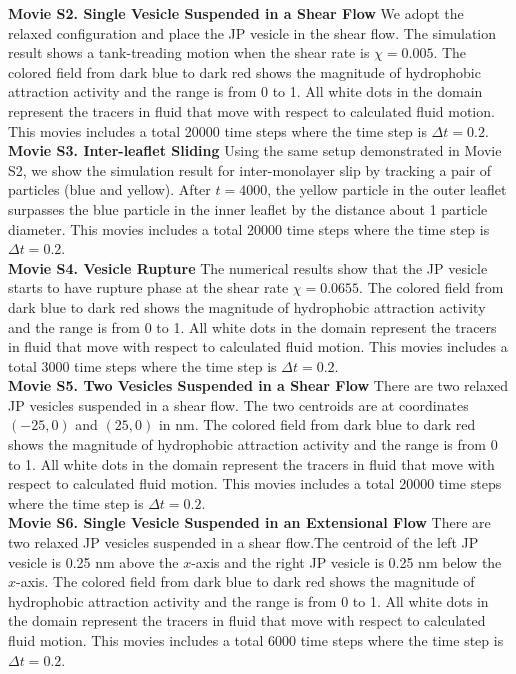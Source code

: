 \noindent
{\bf Movie S2. Single Vesicle Suspended in a Shear Flow} 
We adopt the relaxed configuration and place the JP vesicle in the shear flow. The simulation result shows a tank-treading motion when the shear rate is $\chi=0.005$.
The colored field from dark blue to dark red shows the magnitude of hydrophobic attraction activity and the range is from 0 to 1. All white dots in the domain represent the tracers in fluid that move with respect to calculated fluid motion.
This movies includes a total 20000 time steps where the time step is $\Delta t=0.2$.\\

\noindent
{\bf Movie S3. Inter-leaflet Sliding} 
Using the same setup demonstrated in Movie S2, we show the simulation result for 
inter-monolayer slip by tracking a pair of particles (blue and yellow). After $t=4000$, 
the yellow particle in the outer leaflet surpasses the blue particle in the inner leaflet by the distance about 1 particle diameter.
This movies includes a total 20000 time steps where the time step is $\Delta t=0.2$.\\


\noindent
{\bf Movie S4. Vesicle Rupture} 
The numerical results show that the JP vesicle starts to have rupture phase at the shear rate $\chi=0.0655$. The colored field from dark blue to dark red shows the magnitude of hydrophobic attraction activity and the range is from 0 to 1. All white dots in the domain represent the tracers in fluid that move with respect to calculated fluid motion. This movies includes a total 3000 time steps where the time step is $\Delta t=0.2$.\\


\noindent
{\bf Movie S5. Two Vesicles Suspended in a Shear Flow} 
There are two relaxed JP vesicles suspended in a shear flow. The two centroids are at coordinates $(-25,0)$ and $(25,0)$ in nm. The colored field from dark blue to dark red shows the magnitude of hydrophobic attraction activity and the range is from 0 to 1. All white dots in the domain represent the tracers in fluid that move with respect to calculated fluid motion. This movies includes a total 20000 time steps where the time step is $\Delta t=0.2$.\\


\noindent
{\bf Movie S6. Single Vesicle Suspended in an Extensional Flow} 
There are two relaxed JP vesicles suspended in a shear flow.The centroid of the left JP vesicle is 0.25 nm above the $x$-axis and the right JP vesicle is 0.25 nm below the $x$-axis. The colored field from dark blue to dark red shows the magnitude of hydrophobic attraction activity and the range is from 0 to 1. All white dots in the domain represent the tracers in fluid that move with respect to calculated fluid motion.
This movies includes a total 6000 time steps where the time step is $\Delta t=0.2$.


